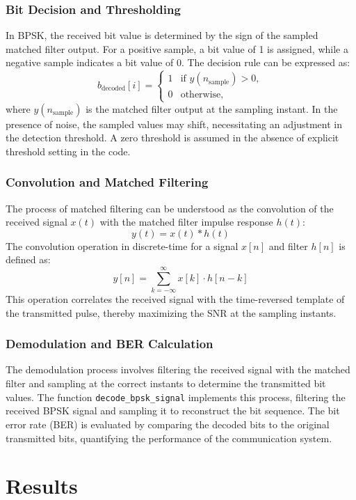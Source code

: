 \documentclass[11pt]{article}
\begin{document}
\subsubsection*{Bit Decision and Thresholding}
In BPSK, the received bit value is determined by the sign of the sampled matched filter output. For a positive sample, a bit value of 1 is assigned, while a negative sample indicates a bit value of 0. The decision rule can be expressed as:
\[ b_{\text{decoded}}[i] = 
\begin{cases}
1 & \text{if } y(n_{\text{sample}}) > 0, \\
0 & \text{otherwise},
\end{cases}
\]
where \( y(n_{\text{sample}}) \) is the matched filter output at the sampling instant. In the presence of noise, the sampled values may shift, necessitating an adjustment in the detection threshold. A zero threshold is assumed in the absence of explicit threshold setting in the code.

\subsubsection*{Convolution and Matched Filtering}
The process of matched filtering can be understood as the convolution of the received signal \( x(t) \) with the matched filter impulse response \( h(t) \):
\[ y(t) = x(t) * h(t) \]
The convolution operation in discrete-time for a signal \( x[n] \) and filter \( h[n] \) is defined as:
\[ y[n] = \sum_{k=-\infty}^{\infty} x[k] \cdot h[n - k] \]
This operation correlates the received signal with the time-reversed template of the transmitted pulse, thereby maximizing the SNR at the sampling instants.

\subsubsection*{Demodulation and BER Calculation}
The demodulation process involves filtering the received signal with the matched filter and sampling at the correct instants to determine the transmitted bit values. The function \texttt{decode\_bpsk\_signal} implements this process, filtering the received BPSK signal and sampling it to reconstruct the bit sequence. The bit error rate (BER) is evaluated by comparing the decoded bits to the original transmitted bits, quantifying the performance of the communication system.


\section*{Results}
\end{document}
